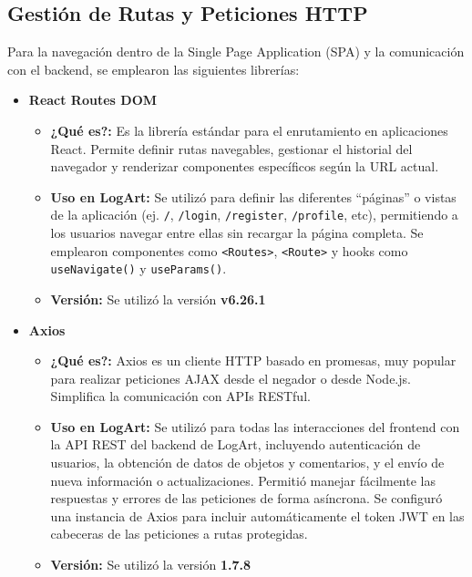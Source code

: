 \subsection{Gestión de Rutas y Peticiones HTTP}
\label{sec:rutasPeticionesFrontend}

Para la navegación dentro de la Single Page Application (SPA) y la comunicación con el backend, se emplearon las siguientes librerías:

\begin{itemize}
    \item \textbf{React Routes DOM}
        \begin{itemize}
            \item \textbf{¿Qué es?:} Es la librería estándar para el enrutamiento en aplicaciones React. Permite definir rutas navegables, gestionar el historial del navegador y renderizar componentes específicos según la URL actual. \cite{urianvieraReactRouterDomGuia}
            \item \textbf{Uso en LogArt:} Se utilizó para definir las diferentes ``páginas'' o vistas de la aplicación (ej. \texttt{/}, \texttt{/login}, \texttt{/register}, \texttt{/profile}, etc), permitiendo a los usuarios navegar entre ellas sin recargar la página completa. Se emplearon componentes como \texttt{<Routes>}, \texttt{<Route>} y hooks como \texttt{useNavigate()} y \texttt{useParams()}.
            \item \textbf{Versión:} Se utilizó la versión \textbf{v6.26.1}
        \end{itemize}
    \vspace{0.3cm}
    \item \textbf{Axios}
        \begin{itemize}
            \item \textbf{¿Qué es?:} Axios es un cliente HTTP basado en promesas, muy popular para realizar peticiones AJAX desde el negador o desde Node.js. Simplifica la comunicación con APIs RESTful. \cite{desarrollowebAxios}
            \item \textbf{Uso en LogArt:} Se utilizó para todas las interacciones del frontend con la API REST del backend de LogArt, incluyendo autenticación de usuarios, la obtención de datos de objetos y comentarios, y el envío de nueva información o actualizaciones. Permitió manejar fácilmente las respuestas y errores de las peticiones de forma asíncrona. Se configuró una instancia de Axios para incluir automáticamente el token JWT en las cabeceras de las peticiones a rutas protegidas.
            \item \textbf{Versión:} Se utilizó la versión \textbf{1.7.8}
        \end{itemize}
\end{itemize}

